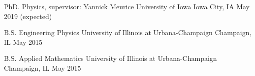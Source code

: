 
\begin{cventries}

    \cventry
    {PhD. Physics, supervisor: Yannick Meurice} %
    {University of Iowa}
    {Iowa City, IA}
    {May 2019 (expected)}
    {}
    \vspace{-2.5ex}

  \cventry
    {B.S. Engineering Physics} %
    {University of Illinois at Urbana-Champaign} %
    {Champaign, IL} %
    {May 2015} %
    {}
    \vspace{-2.5ex}

    \cventry
    {B.S. Applied Mathematics} %
    {University of Illinois at Urbana-Champaign} %
    {Champaign, IL} %
    {May 2015} %
    {}
    \vspace{-2.5ex}

\end{cventries}
